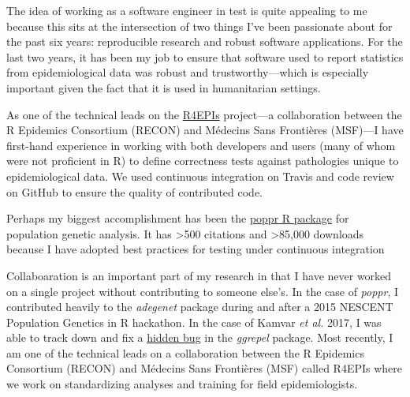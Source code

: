 

The idea of working as a software engineer in test is quite appealing to me
because this sits at the intersection of two things I've been passionate about
for the past six years: reproducible research and robust software applications.
For the last two years, it has been my job to ensure that software used to
report statistics from epidemiological data was robust and trustworthy---which
is especially important given the fact that it is used in humanitarian
settings. 

\vspace{1ex}

As one of the technical leads on the \href{https://r4epis.netlify.com}{R4EPIs}
project---a collaboration between the R Epidemics Consortium (RECON) and
M\'{e}decins Sans Fronti\`{e}res (MSF)---I have first-hand experience in
working with both developers and users (many of whom were not proficient in R)
to define correctness tests against pathologies unique to epidemiological data.
We used continuous integration on Travis and code review on GitHub to ensure
the quality of contributed code.

Perhaps my biggest accomplishment has been the
\href{https://grunwaldlab.github.io/poppr}{poppr R package} for population
genetic analysis. It has \textgreater500 citations and \textgreater85,000
downloads because I have adopted best practices for testing under continuous 
integration 


Collaboaration is an important part of my research in that I have never worked
on a single project without contributing to someone else's. In the case of
\textit{poppr}, I contributed heavily to the \textit{adegenet} package during
and after a 2015 NESCENT Population Genetics in R hackathon. In the case of
Kamvar \textit{et al.} 2017, I was able to track down and fix a
\href{https://github.com/slowkow/ggrepel/issues/72}{hidden bug} in the
\textit{ggrepel} package. Most recently, I am one of the technical leads on a
collaboration between the R Epidemics Consortium (RECON) and M\'{e}decins Sans
Fronti\`{e}res (MSF) called R4EPIs where we work on standardizing analyses and
training for field epidemiologists.  

